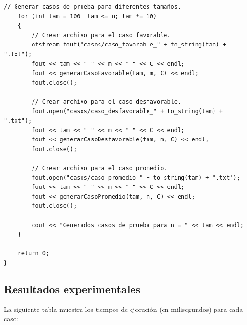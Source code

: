 \documentclass[12pt,a4paper]{article}
\begin{document}
\begin{lstlisting}[caption=Generador de Casos de Prueba, label=lst:generador]
    // Generar casos de prueba para diferentes tamaños.
    for (int tam = 100; tam <= n; tam *= 10)
    {
        // Crear archivo para el caso favorable.
        ofstream fout("casos/caso_favorable_" + to_string(tam) + ".txt");
        fout << tam << " " << m << " " << C << endl;
        fout << generarCasoFavorable(tam, m, C) << endl;
        fout.close();

        // Crear archivo para el caso desfavorable.
        fout.open("casos/caso_desfavorable_" + to_string(tam) + ".txt");
        fout << tam << " " << m << " " << C << endl;
        fout << generarCasoDesfavorable(tam, m, C) << endl;
        fout.close();

        // Crear archivo para el caso promedio.
        fout.open("casos/caso_promedio_" + to_string(tam) + ".txt");
        fout << tam << " " << m << " " << C << endl;
        fout << generarCasoPromedio(tam, m, C) << endl;
        fout.close();

        cout << "Generados casos de prueba para n = " << tam << endl;
    }

    return 0;
}
\end{lstlisting}

\subsection{Resultados experimentales}
La siguiente tabla muestra los tiempos de ejecución (en milisegundos) para cada caso:
\end{document}
